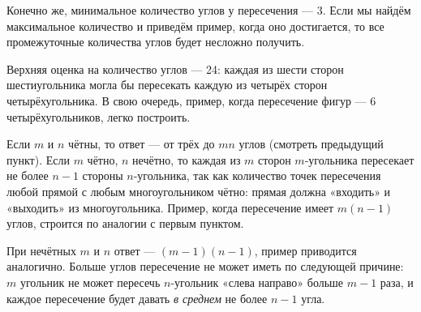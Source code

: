 
\begin{itemize}

\itB Конечно же, минимальное количество углов у пересечения — 3. Если мы найдём максимальное количество и приведём пример, когда оно достигается, то все промежуточные количества углов будет несложно получить.

Верхняя оценка на количество углов — 24: каждая из шести сторон шестиугольника могла бы пересекать каждую из четырёх сторон четырёхугольника. В свою очередь, пример, когда пересечение фигур — 6 четырёхугольников, легко построить.

\itC Если $m$ и $n$ чётны, то ответ — от трёх до $mn$ углов (смотреть предыдущий пункт). Если $m$ чётно, $n$ нечётно, то каждая из $m$ сторон $m$-угольника пересекает не более $n-1$ стороны $n$-угольника, так как количество точек пересечения любой прямой с любым многоугольником чётно: прямая должна «входить» и «выходить» из многоугольника. Пример, когда пересечение имеет $m(n-1)$ углов, строится по аналогии с первым пунктом.

При нечётных $m$ и $n$ ответ — $(m-1)(n-1)$, пример приводится аналогично. Больше углов пересечение не может иметь по следующей причине: $m$ угольник не может пересечь $n$-угольник «слева направо» больше $m-1$ раза, и каждое пересечение будет давать {\itshape в среднем} не более $n-1$ угла.
\end{itemize}